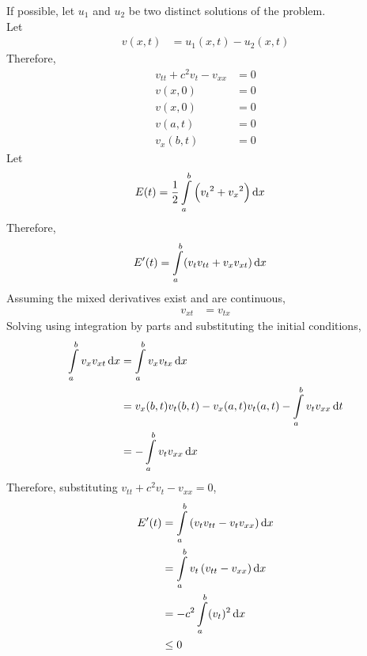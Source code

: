 \documentclass[titlepage, fleqn, a4paper, 12pt, twoside]{article}
\theoremstyle{definition}
\theoremstyle{theorem}
\begin{document}
\begin{solution}
	If possible, let $u_1$ and $u_2$ be two distinct solutions of the problem.\\
	Let
	\begin{align*}
		v(x,t) & = u_1(x,t) - u_2(x,t)
	\end{align*}
	Therefore,
	\begin{align*}
		v_{t t} + c^2 v_t - v_{x x} & = 0 \\
		v(x,0)                      & = 0 \\
		v(x,0)                      & = 0 \\
		v(a,t)                      & = 0 \\
		v_x(b,t)                    & = 0
	\end{align*}
	Let
	\begin{align*}
		E(t) & = \frac{1}{2} \int\limits_{a}^{b} \left( {v_t}^2 + {v_x}^2 \right) \dif x
	\end{align*}
	Therefore,
	\begin{align*}
		E'(t) & = \int\limits_{a}^{b} (v_t v_{t t} + v_x v_{x t}) \dif x
	\end{align*}
	Assuming the mixed derivatives exist and are continuous,
	\begin{align*}
		v_{x t} & = v_{t x}
	\end{align*}
	Solving using integration by parts and substituting the initial conditions,
	\begin{align*}
		\int\limits_{a}^{b} v_x v_{x t} \dif x & = \int\limits_{a}^{b} v_x v_{t x} \dif x                                         \\
                                                       & = v_x(b,t) v_t(b,t) - v_x(a,t) v_t(a,t) - \int\limits_{a}^{b} v_t v_{x x} \dif t \\
                                                       & = -\int\limits_{a}^{b} v_t v_{x x} \dif x
	\end{align*}
	Therefore, substituting $v_{t t} + c^2 v_t - v_{x x} = 0$,
	\begin{align*}
		E'(t) & = \int\limits_{a}^{b} \left( v_t v_{t t} - v_t v_{x x} \right) \dif x \\
                      & = \int\limits_{a}^{b} v_t \left( v_{t t} - v_{x x} \right) \dif x     \\
                      & = -c^2 \int\limits_{a}^{b} (v_t)^2 \dif x                             \\
                      & \le 0
	\end{align*}

\end{solution}
\end{document}
